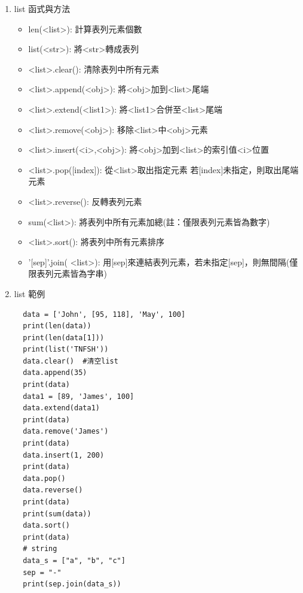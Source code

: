 \documentclass[a4paper,12pt]{article}
\begin{document}
\begin{enumerate}
\item list 函式與方法
\label{sec:orgdf59dd7}
\begin{itemize}
\item len(<list>): 計算表列元素個數\\
\item list(<str>): 將<str>轉成表列\\
\item <list>.clear():	清除表列中所有元素\\
\item <list>.append(<obj>): 將<obj>加到<list>尾端\\
\item <list>.extend(<list1>): 將<list1>合併至<list>尾端\\
\item <list>.remove(<obj>): 移除<list>中<obj>元素\\
\item <list>.insert(<i>,<obj>): 將<obj>加到<list>的索引值<i>位置\\
\item <list>.pop([index]): 從<list>取出指定元素 若[index]未指定，則取出尾端元素\\
\item <list>.reverse():	反轉表列元素\\
\item sum(<list>): 將表列中所有元素加總(註：僅限表列元素皆為數字)\\
\item <list>.sort(): 將表列中所有元素排序\\
\item '[sep]'.join( <list>): 用[sep]來連結表列元素，若未指定[sep]，則無間隔(僅限表列元素皆為字串)\\
\end{itemize}
\item list 範例
\label{sec:orgbfffdea}
\lstset{breaklines=true,language=Python,label= ,caption= ,captionpos=b,firstnumber=1,numbers=left}
\begin{lstlisting}
  data = ['John', [95, 118], 'May', 100]
  print(len(data))
  print(len(data[1]))
  print(list('TNFSH'))
  data.clear()  #清空list
  data.append(35)
  print(data)
  data1 = [89, 'James', 100]
  data.extend(data1)
  print(data)
  data.remove('James')
  print(data)
  data.insert(1, 200)
  print(data)
  data.pop()
  data.reverse()
  print(data)
  print(sum(data))
  data.sort()
  print(data)
  # string
  data_s = ["a", "b", "c"]
  sep = "-"
  print(sep.join(data_s))
\end{lstlisting}


\end{enumerate}
\end{document}
